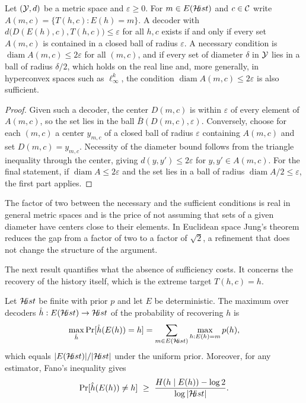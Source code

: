 \begin{theorem}\label{thm:approx}
Let $(\mathcal{Y},d)$ be a metric space and $\varepsilon\ge0$. For $m\in E(\mathcal{H}\!ist)$ and $c\in\mathcal{C}$ write $A(m,c)=\{T(h,c):E(h)=m\}$. A decoder with $d\bigl(D(E(h),c),T(h,c)\bigr)\le\varepsilon$ for all $h,c$ exists if and only if every set $A(m,c)$ is contained in a closed ball of radius $\varepsilon$. A necessary condition is $\operatorname{diam}A(m,c)\le2\varepsilon$ for all $(m,c)$, and if every set of diameter $\delta$ in $\mathcal{Y}$ lies in a ball of radius $\delta/2$, which holds on the real line and, more generally, in hyperconvex spaces such as $\ell_\infty^k$, the condition $\operatorname{diam}A(m,c)\le2\varepsilon$ is also sufficient.
\end{theorem}

\begin{proof}
Given such a decoder, the center $D(m,c)$ is within $\varepsilon$ of every element of $A(m,c)$, so the set lies in the ball $\bar B(D(m,c),\varepsilon)$. Conversely, choose for each $(m,c)$ a center $y_{m,c}$ of a closed ball of radius $\varepsilon$ containing $A(m,c)$ and set $D(m,c)=y_{m,c}$. Necessity of the diameter bound follows from the triangle inequality through the center, giving $d(y,y')\le2\varepsilon$ for $y,y'\in A(m,c)$. For the final statement, if $\operatorname{diam}A\le2\varepsilon$ and the set lies in a ball of radius $\operatorname{diam}A/2\le\varepsilon$, the first part applies.
\end{proof}

The factor of two between the necessary and the sufficient conditions is real in general metric spaces and is the price of not assuming that sets of a given diameter have centers close to their elements. In Euclidean space Jung's theorem reduces the gap from a factor of two to a factor of $\sqrt2$, a refinement that does not change the structure of the argument.

The next result quantifies what the absence of sufficiency costs. It concerns the recovery of the history itself, which is the extreme target $T(h,c)=h$.

\begin{proposition}\label{prop:identlimit}
Let $\mathcal{H}\!ist$ be finite with prior $p$ and let $E$ be deterministic. The maximum over decoders $\hat h:E(\mathcal{H}\!ist)\to\mathcal{H}\!ist$ of the probability of recovering $h$ is
\begin{equation}
\max_{\hat h}\Pr[\hat h(E(h))=h]=\sum_{m\in E(\mathcal{H}\!ist)}\max_{h:E(h)=m}p(h),
\end{equation}
which equals $|E(\mathcal{H}\!ist)|/|\mathcal{H}\!ist|$ under the uniform prior. Moreover, for any estimator, Fano's inequality gives
\begin{equation}
\Pr[\hat h(E(h))\ne h]\ \ge\ \frac{H(h\mid E(h))-\log2}{\log|\mathcal{H}\!ist|}.
\end{equation}
\end{proposition}

